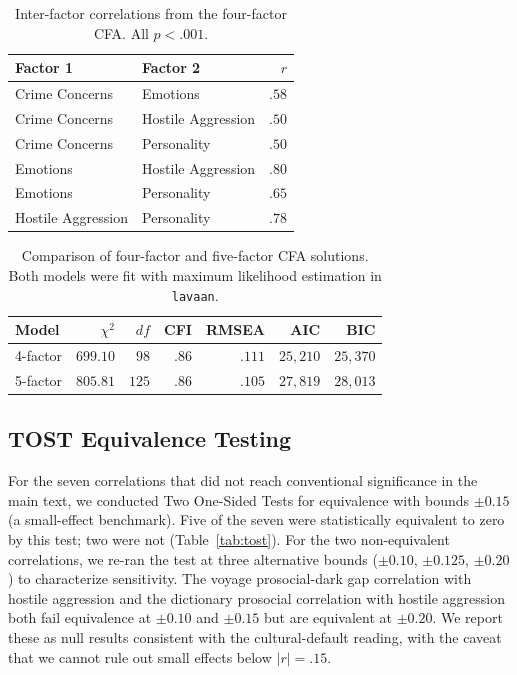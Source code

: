\begin{table}[htbp]
  \centering
  \caption{Inter-factor correlations from the four-factor CFA. All $p < .001$.}
  \label{tab:cfa_corrs}
  \small
  \begin{tabular}{ll r}
    \toprule
    Factor 1 & Factor 2 & $r$ \\
    \midrule
    Crime Concerns & Emotions          & $.58$ \\
    Crime Concerns & Hostile Aggression & $.50$ \\
    Crime Concerns & Personality       & $.50$ \\
    Emotions       & Hostile Aggression & $.80$ \\
    Emotions       & Personality       & $.65$ \\
    Hostile Aggression & Personality   & $.78$ \\
    \bottomrule
  \end{tabular}
\end{table}

\begin{table}[htbp]
  \centering
  \caption{Comparison of four-factor and five-factor CFA solutions. Both models were fit with maximum likelihood estimation in \texttt{lavaan}.}
  \label{tab:cfa_compare}
  \small
  \begin{tabular}{lrrrrrr}
    \toprule
    Model & $\chi^2$ & $df$ & CFI & RMSEA & AIC & BIC \\
    \midrule
    4-factor & $699.10$ & $98$  & $.86$ & $.111$ & $25{,}210$ & $25{,}370$ \\
    5-factor & $805.81$ & $125$ & $.86$ & $.105$ & $27{,}819$ & $28{,}013$ \\
    \bottomrule
  \end{tabular}
\end{table}

\subsection{TOST Equivalence Testing}
\label{sec:supp_tost}

For the seven correlations that did not reach conventional significance in the main text, we conducted Two One-Sided Tests for equivalence \citep{lakens2017equivalence} with bounds $\pm 0.15$ (a small-effect benchmark). Five of the seven were statistically equivalent to zero by this test; two were not (Table~\ref{tab:tost}). For the two non-equivalent correlations, we re-ran the test at three alternative bounds ($\pm 0.10$, $\pm 0.125$, $\pm 0.20$) to characterize sensitivity. The voyage prosocial-dark gap correlation with hostile aggression and the dictionary prosocial correlation with hostile aggression both fail equivalence at $\pm 0.10$ and $\pm 0.15$ but are equivalent at $\pm 0.20$. We report these as null results consistent with the cultural-default reading, with the caveat that we cannot rule out small effects below $|r| = .15$.

